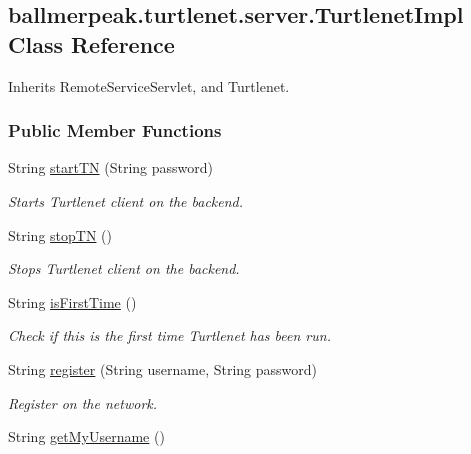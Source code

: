 \hypertarget{classballmerpeak_1_1turtlenet_1_1server_1_1TurtlenetImpl}{\subsection{ballmerpeak.\-turtlenet.\-server.\-Turtlenet\-Impl Class Reference}
\label{classballmerpeak_1_1turtlenet_1_1server_1_1TurtlenetImpl}
}


Inherits Remote\-Service\-Servlet, and Turtlenet.

\subsubsection*{Public Member Functions}
\begin{DoxyCompactItemize}
\item 
String \hyperlink{classballmerpeak_1_1turtlenet_1_1server_1_1TurtlenetImpl_ae95fc767bafaeab9ba8fd2ce0ace0dde}{start\-T\-N} (String password)
\begin{DoxyCompactList}\small\item\em Starts Turtlenet client on the backend. \end{DoxyCompactList}\item 
String \hyperlink{classballmerpeak_1_1turtlenet_1_1server_1_1TurtlenetImpl_a5a81c607293705d6bc5a9b5c087ef411}{stop\-T\-N} ()
\begin{DoxyCompactList}\small\item\em Stops Turtlenet client on the backend. \end{DoxyCompactList}\item 
String \hyperlink{classballmerpeak_1_1turtlenet_1_1server_1_1TurtlenetImpl_a64ed53b1b7c02e2a7869dba9a9adeb6b}{is\-First\-Time} ()
\begin{DoxyCompactList}\small\item\em Check if this is the first time Turtlenet has been run. \end{DoxyCompactList}\item 
String \hyperlink{classballmerpeak_1_1turtlenet_1_1server_1_1TurtlenetImpl_ad77aeae77cad163b1fcd099404747f91}{register} (String username, String password)
\begin{DoxyCompactList}\small\item\em Register on the network. \end{DoxyCompactList}\item 
String \hyperlink{classballmerpeak_1_1turtlenet_1_1server_1_1TurtlenetImpl_a4ad92d61008b207cf46dcfdc31e5ea22}{get\-My\-Username} ()

\end{DoxyCompactItemize}
